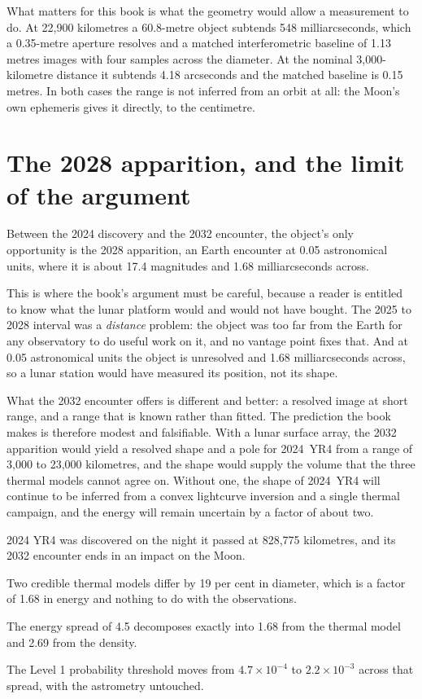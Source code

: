 What matters for this book is what the geometry would allow a measurement to
do. At 22,900 kilometres a 60.8-metre object subtends 548 milliarcseconds,
which a 0.35-metre aperture resolves and a matched interferometric baseline
of 1.13 metres images with four samples across the diameter. At the
nominal 3,000-kilometre distance it subtends 4.18 arcseconds and the matched
baseline is 0.15 metres. In both cases the range is not inferred from an
orbit at all: the Moon's own ephemeris gives it directly, to the centimetre.

\section{The 2028 apparition, and the limit of the argument}

Between the 2024 discovery and the 2032 encounter, the object's only
opportunity is the 2028 apparition, an Earth encounter at 0.05 astronomical
units, where it is about 17.4 magnitudes and 1.68 milliarcseconds across.

This is where the book's argument must be careful, because a reader is
entitled to know what the lunar platform would and would not have bought.
The 2025 to 2028 interval was a \emph{distance} problem: the object was too
far from the Earth for any observatory to do useful work on it, and no
vantage point fixes that. And at 0.05 astronomical units the object is
unresolved and 1.68 milliarcseconds across, so a lunar station would have
measured its position, not its shape.

What the 2032 encounter offers is different and better: a resolved image at
short range, and a range that is known rather than fitted. The prediction the
book makes is therefore modest and falsifiable. With a lunar surface array,
the 2032 apparition would yield a resolved shape and a pole for 2024~YR4
from a range of 3,000 to 23,000 kilometres, and the shape would supply the
volume that the three thermal models cannot agree on. Without one, the shape
of 2024~YR4 will continue to be inferred from a convex lightcurve inversion
and a single thermal campaign, and the energy will remain uncertain by a
factor of about two.

\begin{keytakeaways}
\item 2024 YR4 was discovered on the night it passed at 828,775 kilometres,
and its 2032 encounter ends in an impact on the Moon.
\item Two credible thermal models differ by 19 per cent in diameter, which is
a factor of 1.68 in energy and nothing to do with the observations.
\item The energy spread of 4.5 decomposes exactly into 1.68 from the thermal
model and 2.69 from the density.
\item The Level 1 probability threshold moves from \(4.7\times10^{-4}\) to
\(2.2\times10^{-3}\) across that spread, with the astrometry untouched.
\end{keytakeaways}
